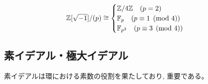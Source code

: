 \begin{egprob}
\[\mathbb{Z}[\sqrt{-1}]/(p) \cong
\begin{cases}
\mathbb{Z}/4\mathbb{Z}\quad (p=2)\\
\mathbb{F}_{p}\quad (p\equiv 1\pmod{4})\\
\mathbb{F}_{p^2} \quad (p\equiv 3\pmod{4})
\end{cases}\]
\end{egprob}









\subsection{素イデアル・極大イデアル}
素イデアルは環における素数の役割を果たしており, 重要である。

